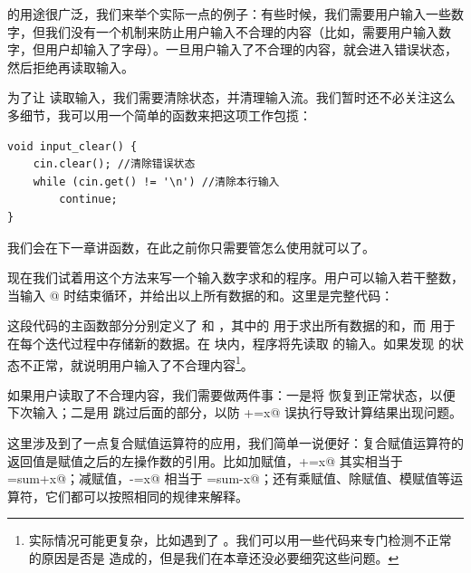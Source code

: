 \lstinline@continue@ 的用途很广泛，我们来举个实际一点的例子：有些时候，我们需要用户输入一些数字，但我们没有一个机制来防止用户输入不合理的内容（比如，需要用户输入数字，但用户却输入了字母）。一旦用户输入了不合理的内容，\lstinline@cin@ 就会进入错误状态，然后拒绝再读取输入。\par
为了让 \lstinline@cin@ 读取输入，我们需要清除状态，并清理输入流。我们暂时还不必关注这么多细节，我可以用一个简单的函数来把这项工作包揽：
\begin{lstlisting}
void input_clear() {
    cin.clear(); //清除错误状态
    while (cin.get() != '\n') //清除本行输入
        continue;
}
\end{lstlisting}
我们会在下一章讲函数，在此之前你只需要管怎么使用就可以了。\par
现在我们试着用这个方法来写一个输入数字求和的程序。用户可以输入若干整数，当输入 @ 时结束循环，并给出以上所有数据的和。这里是完整代码：

这段代码的主函数部分分别定义了 \lstinline@sum@ 和 \lstinline@x@，其中的 \lstinline@sum@ 用于求出所有数据的和，而 \lstinline@x@ 用于在每个迭代过程中存储新的数据。在 \lstinline@while@ 块内，程序将先读取 \lstinline@x@ 的输入。如果发现 \lstinline@cin@ 的状态不正常，就说明用户输入了不合理内容\footnote{实际情况可能更复杂，比如遇到了 \lstinline@EOF@。我们可以用一些代码来专门检测不正常的原因是否是 \lstinline@EOF@ 造成的，但是我们在本章还没必要细究这些问题。}。\par
如果用户读取了不合理内容，我们需要做两件事：一是将 \lstinline@cin@ 恢复到正常状态，以便下次输入；二是用 \lstinline@continue@ 跳过后面的部分，以防 \lstinline@sum+=x@ 误执行导致计算结果出现问题。\par
这里涉及到了一点复合赋值运算符的应用，我们简单一说便好：复合赋值运算符的返回值是赋值之后的左操作数的引用。比如加赋值，\lstinline@sum+=x@ 其实相当于 \lstinline@sum=sum+x@；减赋值，\lstinline@sum-=x@ 相当于 \lstinline@sum=sum-x@；还有乘赋值、除赋值、模赋值等运算符，它们都可以按照相同的规律来解释。\par
